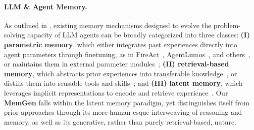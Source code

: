 \documentclass[]{fairmeta}
\newcommand{\ourmethod}{{\fontfamily{lmtt}\selectfont \textbf{MemGen}}\xspace}
\begin{document}
\paragraph{LLM \& Agent Memory.} As outlined in , existing memory mechanisms designed to evolve the problem-solving capacity of LLM agents can be broadly categorized into three classes: \textbf{(I) parametric memory}, which either integrates past experiences directly into agent parameters through finetuning, as in FireAct~\citep{chen2023fireactlanguageagentfinetuning}, AgentLumos~\citep{yin2024agentlumosunifiedmodular}, and others~\citep{zhang2024agentohanadesignunifieddata,fu2025agentrefineenhancingagentgeneralization}, or maintains them in external parameter modules~\citep{tack2024onlineadaptationlanguagemodels,wang2024wiserethinkingknowledgememory}; \textbf{(II) retrieval-based memory}, which abstracts prior experiences into transferable knowledge~\citep{zhang2025gmemorytracinghierarchicalmemory,zhao2024expelllmagentsexperiential}, or distills them into reusable tools and skills~\citep{zheng2025skillweaverwebagentsselfimprove,wang2025mobileagenteselfevolvingmobileassistant,qiu2025alitageneralistagentenabling,qiu2025agentdistilltrainingfreeagentdistillation}; and \textbf{(III) latent memory}, which leverages implicit representations to encode and retrieve experience~\citep{wang2024memoryllm,wang2025mextendingmemoryllmscalable,hu2025beyond,liu2024deliberation,sun2025enhancinglatentcomputationtransformers}. Our \ourmethod falls within the latent memory paradigm, yet distinguishes itself from prior approaches through its more human-esque interweaving of reasoning and memory, as well as its generative, rather than purely retrieval-based, nature.



\vspace{-0.7em}
\end{document}
